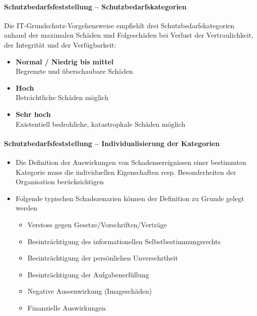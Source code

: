 \documentclass[10pt,a4paper]{article}
\begin{document}
\paragraph*{Schutzbedarfsfeststellung – Schutzbedarfskategorien} Die IT-Grundschutz-Vorgehensweise empfiehlt drei Schutzbedarfskategorien anhand der maximalen
Schäden und Folgeschäden bei Verlust der Vertraulichkeit, der Integrität und der Verfügbarkeit:
\begin{itemize}[noitemsep,topsep=0pt,leftmargin=*]
    \item \textbf{Normal / Niedrig bis mittel}\\Begrenzte und überschaubare Schäden
    \item \textbf{Hoch}\\Beträchtliche Schäden möglich
    \item \textbf{Sehr hoch}\\Existentiell bedrohliche, katastrophale Schäden
    möglich
\end{itemize}

\paragraph*{Schutzbedarfsfeststellung – Individualisierung der Kategorien}
\begin{itemize}[noitemsep,topsep=0pt,leftmargin=*]
    \item Die Definition der Auswirkungen von
    Schadensereignissen einer bestimmten Kategorie
    muss die individuellen Eigenschaften resp.
    Besonderheiten der Organisation berücksichtigen
    \item Folgende typischen Schadszenarien können der
    Definition zu Grunde gelegt werden
    \begin{itemize}[noitemsep,topsep=0pt,leftmargin=*]
        \item Verstoss gegen Gesetze/Vorschriften/Verträge
        \item Beeinträchtigung des informationellen
        Selbstbestimmungsrechts
        \item Beeinträchtigung der persönlichen Unversehrtheit
        \item Beeinträchtigung der Aufgabenerfüllung
        \item Negative Aussenwirkung (Imageschäden)
        \item Finanzielle Auswirkungen
    \end{itemize}
\end{itemize}
\end{document}
